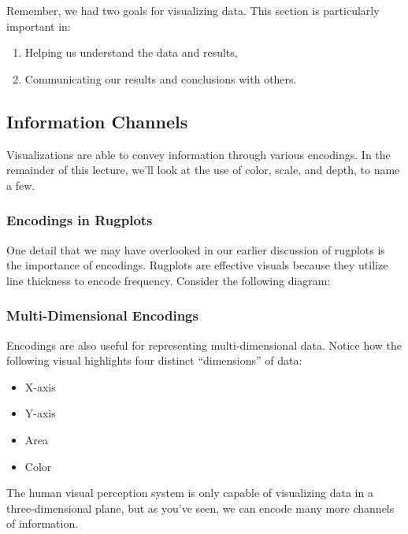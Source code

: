 \documentclass[
  letterpaper,
  DIV=11,
  numbers=noendperiod]{scrreprt}
\providecommand{\tightlist}{%
  \setlength{\itemsep}{0pt}\setlength{\parskip}{0pt}}\usepackage{longtable,booktabs,array}
\begin{document}
Remember, we had two goals for visualizing data. This section is
particularly important in:

\begin{enumerate}
\def\labelenumi{\arabic{enumi}.}
\tightlist
\item
  Helping us understand the data and results,
\item
  Communicating our results and conclusions with others.
\end{enumerate}

\subsection{Information Channels}\label{information-channels}

Visualizations are able to convey information through various encodings.
In the remainder of this lecture, we'll look at the use of color, scale,
and depth, to name a few.

\subsubsection{Encodings in Rugplots}\label{encodings-in-rugplots}

One detail that we may have overlooked in our earlier discussion of
rugplots is the importance of encodings. Rugplots are effective visuals
because they utilize line thickness to encode frequency. Consider the
following diagram:

\subsubsection{Multi-Dimensional
Encodings}\label{multi-dimensional-encodings}

Encodings are also useful for representing multi-dimensional data.
Notice how the following visual highlights four distinct ``dimensions''
of data:

\begin{itemize}
\tightlist
\item
  X-axis
\item
  Y-axis
\item
  Area
\item
  Color
\end{itemize}

The human visual perception system is only capable of visualizing data
in a three-dimensional plane, but as you've seen, we can encode many
more channels of information.
\end{document}
